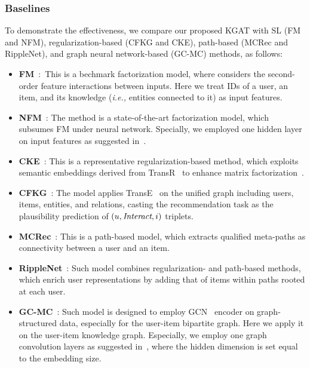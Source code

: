 \documentclass[sigconf]{acmart}
\newcommand{\ie}{\emph{i.e., }}
\theoremstyle{definition}
\begin{document}
\subsubsection{\textbf{Baselines}}
To demonstrate the effectiveness, we compare our proposed KGAT with SL (FM and NFM), regularization-based (CFKG and CKE), path-based (MCRec and RippleNet), and graph neural network-based (GC-MC) methods, as follows:

\begin{itemize}[leftmargin=*]
	\item \textbf{FM}~\cite{FM}:~This is a bechmark factorization model, where considers the second-order feature interactions between inputs. Here we treat IDs of a user, an item, and its knowledge (\ie entities connected to it) as input features.
	
	\item \textbf{NFM}~\cite{NFM}: The method is a state-of-the-art factorization model, which subsumes FM under neural network. Specially, we employed one hidden layer on input features as suggested in~\cite{NFM}.
	
	\item \textbf{CKE}~\cite{CKE}: This is a representative regularization-based method, which exploits semantic embeddings derived from TransR~\cite{TransR} to enhance matrix factorization~\cite{BPRMF}.
    
    \item \textbf{CFKG}~\cite{CFKG}: The model applies TransE~\cite{TransE} on the unified graph including users, items, entities, and relations, casting the recommendation task as the plausibility prediction of $(u,\emph{Interact},i)$ triplets.
    
    \item \textbf{MCRec}~\cite{MCRec}: This is a path-based model, which extracts qualified meta-paths as connectivity between a user and an item.
    
	\item \textbf{RippleNet}~\cite{RippleNet}: Such model combines regularization- and path-based methods, which enrich user representations by adding that of items within paths rooted at each user.
	
	\item \textbf{GC-MC}~\cite{GC-MC}: Such model is designed to employ GCN~\cite{GCN} encoder on graph-structured data, especially for the user-item bipartite graph. Here we apply it on the user-item knowledge graph. Especially, we employ one graph convolution layers as suggested in~\cite{GC-MC}, where the hidden dimension is set equal to the embedding size.
\end{itemize}
\end{document}
